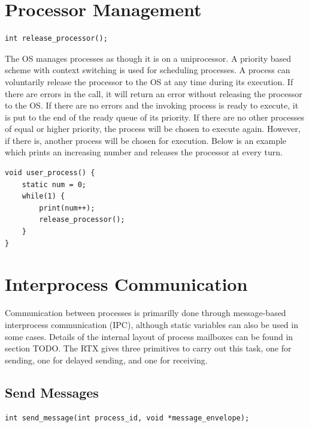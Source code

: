 \documentclass[12pt]{report}
\begin{document}
\bigskip

\section{Processor Management}
\begin{lstlisting}
int release_processor();
\end{lstlisting}

\par The OS manages processes as though it is on a uniprocessor. A priority based scheme with context switching is used for scheduling processes. A process can voluntarily release the processor to the OS at any time during its execution. If there are errors in the call, it will return an error without releasing the processor to the OS. If there are no errors and the invoking process is ready to execute, it is put to the end of the ready queue of its priority. If there are no other processes of equal or higher priority, the process will be chosen to execute again. However, if there is, another process will be chosen for execution. Below is an example which prints an increasing number and releases the processor at every turn.

\begin{lstlisting}
void user_process() {
    static num = 0;
    while(1) {
        print(num++);
        release_processor();
    }
}
\end{lstlisting}

\section{Interprocess Communication}
\par Communication between processes is primarilly done through message-based interprocess communication (IPC), although static variables can also be used in some cases. Details of the internal layout of process mailboxes can be found in section TODO. The RTX gives three primitives to carry out this task, one for sending, one for delayed sending, and one for receiving.

\subsection{Send Messages}
\label{sec:send_message}
\begin{lstlisting}
int send_message(int process_id, void *message_envelope);
\end{lstlisting}
\end{document}

